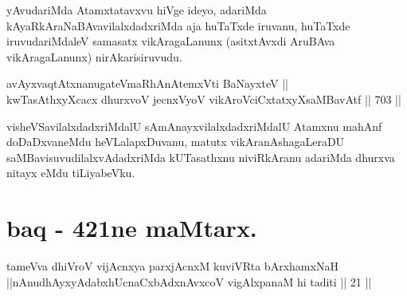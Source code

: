 \begin{artha} 
yAvudariMda Atamxtatavxvu hiVge ideyo, adariMda kAyaRkAraNaBAvavilalxdadxriMda aja huTaTxde iruvanu, huTaTxde iruvudariMdaleV samasatx vikAragaLanunx (asitxtAvxdi AruBAva vikAragaLanunx) nirAkarisiruvudu.
\end{artha}

\begin{shl}
avAyxvaqtAtxnanugateVmaRhAnAtemxVti BaNayxteV || \\
kwTasAthxyXcacx dhurxvoV jecnxVyoV vikAroVciCxtatxyXsaMBavAtf \hfill || 703 ||  
\end{shl}

\begin{artha} 
visheVSavilalxdadxriMdalU sAmAnayxvilalxdadxriMdalU Atamxnu mahAnf doDaDxvaneMdu heVLalapxDuvanu, matutx vikAranAshagaLeraDU saMBavisuvudilalxvAdadxriMda kUTasathxnu niviRkAranu adariMda dhurxva nitayx eMdu tiLiyabeVku.
\end{artha}

\section*{baq - 4\ndash 21ne maMtarx.}

\begin{shl}
tameVva dhiVroV vijAcnxya parxjAcnxM kuviVRta bArxhamxNaH ||nAnudhAyxyAdabxhUcnaCxbAdxnAvxcoV vigAlxpanaM hi taditi || 21 ||
\end{shl}


